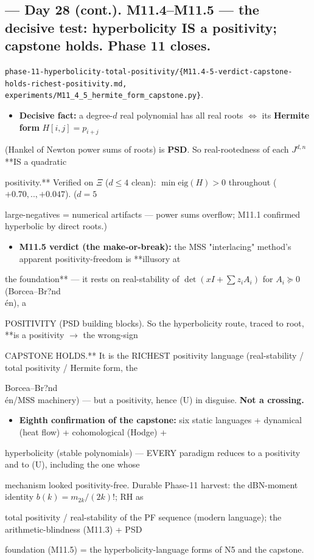 \documentclass[10pt]{article}
\begin{document}
\subsection*{ --- Day 28 (cont.). M11.4--M11.5 --- the decisive test: hyperbolicity IS a positivity; capstone holds. Phase 11 closes.}
\texttt{phase-11-hyperbolicity-total-positivity/\{M11.4-5-verdict-capstone-holds-richest-positivity.md, experiments/M11\_4\_5\_hermite\_form\_capstone.py\}}.\par
\begin{itemize}
\item \textbf{Decisive fact:} a degree-$d$ real polynomial has all real roots $\iff$ its \textbf{Hermite form} $H[i,j]=p_{i+j}$
\end{itemize}
  (Hankel of Newton power sums of roots) is \textbf{PSD}. So real-rootedness of each $J^{d,n}$ **IS a quadratic\par
  positivity.** Verified on $\Xi$ ($d\le4$ clean): $\min\mathrm{eig}(H)>0$ throughout ($+0.70,..,+0.047$). ($d=5$\par
  large-negatives = numerical artifacts --- power sums overflow; M11.1 confirmed hyperbolic by direct roots.)\par
\begin{itemize}
\item \textbf{M11.5 verdict (the make-or-break):} the MSS "interlacing" method's apparent positivity-freedom is **illusory at
\end{itemize}
  the foundation** --- it rests on real-stability of $\det(xI+\sum z_iA_i)$ for $A_i\succeq0$ (Borcea--Br?nd\\\'en), a\par
  POSITIVITY (PSD building blocks). So the hyperbolicity route, traced to root, **is a positivity \ensuremath{\to} the wrong-sign\par
  CAPSTONE HOLDS.** It is the RICHEST positivity language (real-stability / total positivity / Hermite form, the\par
  Borcea--Br?nd\\\'en/MSS machinery) --- but a positivity, hence (U) in disguise. \textbf{Not a crossing.}\par
\begin{itemize}
\item \textbf{Eighth confirmation of the capstone:} six static languages + dynamical (heat flow) + cohomological (Hodge) +
\end{itemize}
  hyperbolicity (stable polynomials) --- EVERY paradigm reduces to a positivity and to (U), including the one whose\par
  mechanism looked positivity-free. Durable Phase-11 harvest: the dBN-moment identity $b(k)=m_{2k}/(2k)!$; RH as\par
  total positivity / real-stability of the PF sequence (modern language); the arithmetic-blindness (M11.3) + PSD\par
  foundation (M11.5) = the hyperbolicity-language forms of N5 and the capstone.\par
\end{document}
